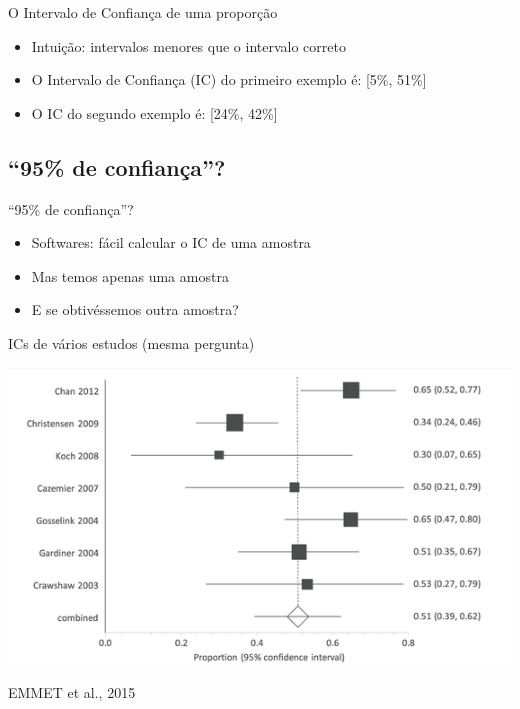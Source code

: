 \documentclass{beamer}
\begin{document}
\begin{frame}{O Intervalo de Confiança de uma proporção}
  \begin{itemize}
    \footnotesize
  \item Intuição: intervalos menores que o intervalo correto
  \item O \alert{Intervalo de Confiança} (IC) do primeiro exemplo é: [5\%, 51\%]
  \item O IC do segundo exemplo é: [24\%, 42\%]
  \end{itemize}
\end{frame}


\subsection{``95\% de confiança''?}

\begin{frame}{``95\% de confiança''?}
  \begin{itemize}
    \footnotesize
  \item Softwares: fácil calcular o IC de uma amostra
  \item Mas temos apenas \alert{uma} amostra
  \item E se obtivéssemos outra amostra?
  \end{itemize}
\end{frame}

\begin{frame}{\scriptsize ICs de vários estudos (mesma pergunta)}
  \begin{center}
    \includegraphics[width=.8\textwidth]{Cap2/IC-prop-n-amostras.png}
  \end{center}

  \vfill
  \hfill \tiny EMMET et al., 2015
\end{frame}
\end{document}
